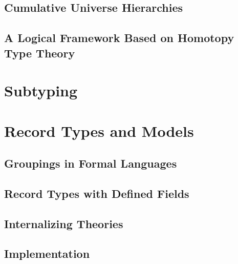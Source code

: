 \documentclass[a4paper,11pt]{book}
\begin{document}
\section{Cumulative Universe Hierarchies}\label{sec:lf:lfx:hierarchy}


\section{A Logical Framework Based on Homotopy Type Theory}\label{sec:lf:lfx:hott}


\chapter{Subtyping}\label{sec:lf:lfx:subtp}



\lstDeleteShortInline*

\chapter{Record Types and Models}\label{sec:lf:records}

\section{Groupings in Formal Languages}

\section{Record Types with Defined Fields}\label{sec:lf:records:def}

\section{Internalizing Theories}

\section{Implementation}

\end{document}
